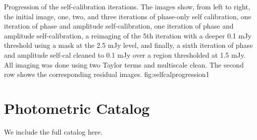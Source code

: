 \documentclass[twocolumn]{aastex61}
\begin{document}
{Progression of the self-calibration iterations.  The images show, from left to
right, the initial image, one, two, and three iterations of phase-only self
calibration, one iteration of phase and amplitude self-calibration, one
iteration of phase and amplitude self-calibration, a reimaging of the 5th
iteration with a deeper 0.1 mJy threshold using a mask at the 2.5 mJy level,
and finally, a sixth iteration of phase and amplitude self-cal cleaned to
0.1 mJy over a region thresholded at 1.5 mJy.
All imaging was done using two Taylor terms and multiscale clean.
The second row shows the corresponding residual images.}
{fig:selfcalprogression}{1}{\textwidth}

\section{Photometric Catalog}
We include the full catalog here.


\end{document}
